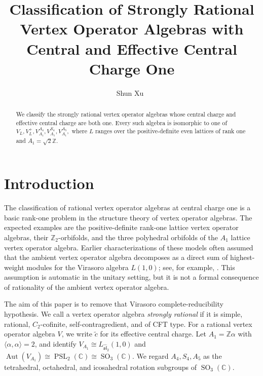 \documentclass[12pt,leqno]{amsart}
\numberwithin{equation}{section} \newtheorem{thm}{Theorem}[section] \newtheorem{lem}[thm]{Lemma} \newtheorem{ex}[thm]{Example} \newtheorem{prop}[thm]{Proposition} \newtheorem{cor}[thm]{Corollary} \newtheorem{defi}[thm]{Definition} \newtheorem{rmk}[thm]{Remark} \newtheorem{notation}[thm]{Notation}
\newcommand{\Aut}{\operatorname{Aut}}
\newcommand{\SO}{\operatorname{SO}}
\newcommand{\PSLtwo}{\operatorname{PSL}_2(\C)}
\def\Z{\mathbb{Z}} \def\N{\mathbb{N}} \def\A{\mathbb{A}} \def\C{\mathbb{C}} \def\R{\mathbb{R}} \def\Q{\mathbb{Q}} \def\F{\mathbb{F}}
\begin{document}
\title[]{Classification of Strongly Rational Vertex Operator Algebras with Central and Effective Central Charge One}

\author{Shun Xu~}

\address{School of Mathematical Sciences, Anhui University, Anhui, Hefei, 230601, China}




\begin{abstract}
We classify the strongly rational vertex operator algebras whose central charge and effective central charge are both one. Every such algebra is isomorphic to one of \(V_L,V_L^+,V_{A_1}^{A_4},V_{A_1}^{S_4},V_{A_1}^{A_5},\) where $L$ ranges over the positive-definite even lattices of rank one and $A_1=\sqrt2\Z$.
\end{abstract}

\maketitle

\section{Introduction}

The classification of rational vertex operator algebras at central charge one is a basic rank-one problem in the structure theory of vertex operator algebras. The expected examples are the positive-definite rank-one lattice vertex operator algebras, their $\mathbb Z_2$-orbifolds, and the three polyhedral orbifolds of the $A_1$ lattice vertex operator algebra. Earlier characterizations of these models often assumed that the ambient vertex operator algebra decomposes as a direct sum of highest-weight modules for the Virasoro algebra $L(1,0)$; see, for example, \cite{DJplusI,DJplusII,DJA4}. This assumption is automatic in the unitary setting, but it is not a formal consequence of rationality of the ambient vertex operator algebra.

The aim of this paper is to remove that Virasoro complete-reducibility hypothesis. We call a vertex operator algebra \emph{strongly rational} if it is simple, rational, $C_2$-cofinite, self-contragredient, and of CFT type. For a rational vertex operator algebra $V$, we write $\widetilde c$ for its effective central charge. Let $A_1=\mathbb Z\alpha$ with $\langle\alpha,\alpha\rangle=2$, and identify $V_{A_1}\cong L_{\widehat{\mathfrak{sl}}_2}(1,0)$ and $\Aut(V_{A_1})\cong\PSLtwo\cong\SO_3(\C)$. We regard $A_4,S_4,A_5$ as the tetrahedral, octahedral, and icosahedral rotation subgroups of $\SO_3(\C)$.
\end{document}
